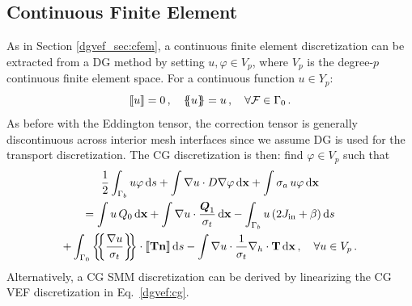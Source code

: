 \documentclass[../doc.tex]{subfiles}
\begin{document}
\subsection{Continuous Finite Element}
As in Section \ref{dgvef_sec:cfem}, a continuous finite element discretization can be extracted from a DG method by setting $u,\varphi \in V_p$, where $V_p$ is the degree-$p$ continuous finite element space. For a continuous function $u \in Y_p$: 
	\begin{equation}
		\left\llbracket u \right\rrbracket = 0 \,, \quad \left\{\!\!\left\{u\right\}\!\!\right\} = u \,, \quad \forall \mathcal{F} \in \Gamma_0 \,. 
	\end{equation}
As before with the Eddington tensor, the correction tensor is generally discontinuous across interior mesh interfaces since we assume DG is used for the transport discretization. The CG discretization is then: find $\varphi \in V_p$ such that 
	\begin{multline}
		\frac{1}{2}\int_{\Gamma_b} u\varphi \ud s + \int \nabla u \cdot D\nabla\varphi \ud \x + \int \sigma_a\, u \varphi \ud \x \\
		= \int u\, Q_0 \ud \x + \int \nabla u \cdot \frac{\vec{Q}_1}{\sigma_t} \ud \x - \int_{\Gamma_b} u\paren{2\Jin + \beta} \ud s \\
		+ \int_{\Gamma_0} \avg{\frac{\nabla u}{\sigma_t}} \cdot\jump{\T\n} \ud s - \int \nabla u\cdot \frac{1}{\sigma_t}\nablah\cdot\T \ud \x \,, \quad \forall u \in V_p \,. 
	\end{multline}
Alternatively, a CG SMM discretization can be derived by linearizing the CG VEF discretization in Eq.~\ref{dgvef:cg}. 
\end{document}
